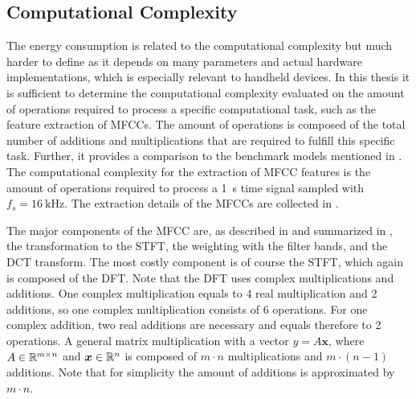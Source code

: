 
\subsection{Computational Complexity}\label{sec:signal_mfcc_complexity}
The energy consumption is related to the computational complexity but much harder to define as it depends on many parameters and actual hardware implementations, which is especially relevant to handheld devices.
In this thesis it is sufficient to determine the computational complexity evaluated on the amount of operations required to process a specific computational task, such as the feature extraction of MFCCs.
The amount of operations is composed of the total number of additions and multiplications that are required to fulfill this specific task.
Further, it provides a comparison to the benchmark models mentioned in .
The computational complexity for the extraction of MFCC features is the amount of operations required to process a \SI{1}{\second} time signal sampled with $f_s = \SI{16}{\kilo\hertz}$.
The extraction details of the MFCCs are collected in .

The major components of the MFCC are, as described in  and summarized in , the transformation to the STFT, the weighting with the filter bands, and the DCT transform.
The most costly component is of course the STFT, which again is composed of the DFT.
Note that the DFT uses complex multiplications and additions.
One complex multiplication equals to 4 real multiplication and 2 additions, so one complex multiplication consists of 6 operations.
For one complex addition, two real additions are necessary and equals therefore to 2 operations.
A general matrix multiplication with a vector $y = A \bm{x}$, where $A \in \mathbb{R}^{m \times n}$ and $\bm{x} \in \mathbb{R}^n$ is composed of $m \cdot n$ multiplications and $m \cdot (n - 1)$ additions.
Note that for simplicity the amount of additions is approximated by $m \cdot n$.

